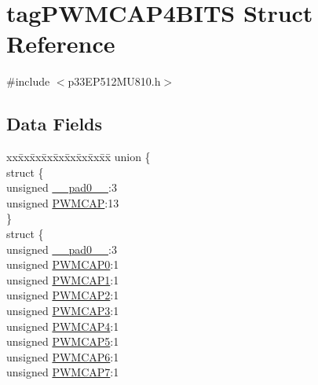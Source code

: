 \hypertarget{structtag_p_w_m_c_a_p4_b_i_t_s}{}\section{tag\+P\+W\+M\+C\+A\+P4\+B\+I\+TS Struct Reference}
\label{structtag_p_w_m_c_a_p4_b_i_t_s}


{\ttfamily \#include $<$p33\+E\+P512\+M\+U810.\+h$>$}

\subsection*{Data Fields}
\begin{DoxyCompactItemize}
\item 
\begin{tabbing}
xx\=xx\=xx\=xx\=xx\=xx\=xx\=xx\=xx\=\kill
union \{\\
\>struct \{\\
\>\>unsigned \hyperlink{structtag_p_w_m_c_a_p4_b_i_t_s_adf71f3d8410c1f1dbbc96680a92c49af}{\_\_pad0\_\_}:3\\
\>\>unsigned \hyperlink{structtag_p_w_m_c_a_p4_b_i_t_s_a3877a5299772d03214ef452994c53979}{PWMCAP}:13\\
\>\} \\
\>struct \{\\
\>\>unsigned \hyperlink{structtag_p_w_m_c_a_p4_b_i_t_s_adf71f3d8410c1f1dbbc96680a92c49af}{\_\_pad0\_\_}:3\\
\>\>unsigned \hyperlink{structtag_p_w_m_c_a_p4_b_i_t_s_a34c685289d01ac79a9b067b945e411b0}{PWMCAP0}:1\\
\>\>unsigned \hyperlink{structtag_p_w_m_c_a_p4_b_i_t_s_a4c90f0d96eece06b7d6c7e41e394b417}{PWMCAP1}:1\\
\>\>unsigned \hyperlink{structtag_p_w_m_c_a_p4_b_i_t_s_a2111a4368f6512c24cf193f6c83672e3}{PWMCAP2}:1\\
\>\>unsigned \hyperlink{structtag_p_w_m_c_a_p4_b_i_t_s_a5d3e7376fc29096ef98492e81f73590d}{PWMCAP3}:1\\
\>\>unsigned \hyperlink{structtag_p_w_m_c_a_p4_b_i_t_s_a07f7fb680f8c9bdd5d3c94a84a30a7b5}{PWMCAP4}:1\\
\>\>unsigned \hyperlink{structtag_p_w_m_c_a_p4_b_i_t_s_a434b71ab2093a53faf535c8f27973f7b}{PWMCAP5}:1\\
\>\>unsigned \hyperlink{structtag_p_w_m_c_a_p4_b_i_t_s_a4249adbed71df183d967bd51f8d811fa}{PWMCAP6}:1\\
\>\>unsigned \hyperlink{structtag_p_w_m_c_a_p4_b_i_t_s_a282c7ae90ac64b1a78eb1351a7d0eee0}{PWMCAP7}:1\\

\end{tabbing}
\end{DoxyCompactItemize}
